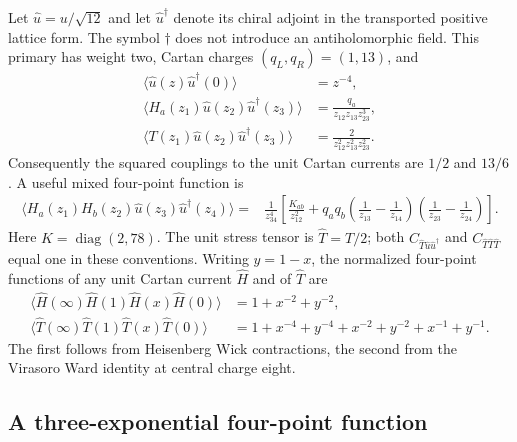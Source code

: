 Let $\widehat u=u/\sqrt{12}$ and let $\widehat u^\dagger$ denote its
chiral adjoint in the transported positive lattice form.  The symbol
$\dagger$ does not introduce an antiholomorphic field.  This primary has
weight two, Cartan charges $(q_L,q_R)=(1,13)$, and
\begin{align}
 \langle\widehat u(z)\widehat u^\dagger(0)\rangle&=z^{-4},\\
 \langle H_a(z_1)\widehat u(z_2)\widehat u^\dagger(z_3)\rangle
  &=\frac{q_a}{z_{12}z_{13}z_{23}^{3}},\\
 \langle T(z_1)\widehat u(z_2)\widehat u^\dagger(z_3)\rangle
  &=\frac{2}{z_{12}^{2}z_{13}^{2}z_{23}^{2}}.
\end{align}
Consequently the squared couplings to the unit Cartan currents are
$1/2$ and $13/6$.  A useful mixed four-point function is
\begin{equation}
 \begin{aligned}
 \langle H_a(z_1)H_b(z_2)\widehat u(z_3)
                  \widehat u^\dagger(z_4)\rangle
 ={}&\frac{1}{z_{34}^{4}}\left[
 \frac{K_{ab}}{z_{12}^{2}}+
 q_aq_b\left(\frac1{z_{13}}-\frac1{z_{14}}\right)
       \left(\frac1{z_{23}}-\frac1{z_{24}}\right)\right].
 \end{aligned}
\end{equation}
Here $K=\operatorname{diag}(2,78)$.
The unit stress tensor is $\widehat T=T/2$; both
$C_{\widehat T\widehat u\widehat u^\dagger}$ and
$C_{\widehat T\widehat T\widehat T}$ equal one in these conventions.
Writing $y=1-x$, the normalized four-point functions of any unit
Cartan current $\widehat H$ and of $\widehat T$ are
\begin{align}
 \langle\widehat H(\infty)\widehat H(1)
                 \widehat H(x)\widehat H(0)\rangle
 &=1+x^{-2}+y^{-2},\\
 \langle\widehat T(\infty)\widehat T(1)
                 \widehat T(x)\widehat T(0)\rangle
 &=1+x^{-4}+y^{-4}+x^{-2}+y^{-2}+x^{-1}+y^{-1}.
\end{align}
The first follows from Heisenberg Wick contractions, the second from
the Virasoro Ward identity at central charge eight.

\subsection{A three-exponential four-point function}

